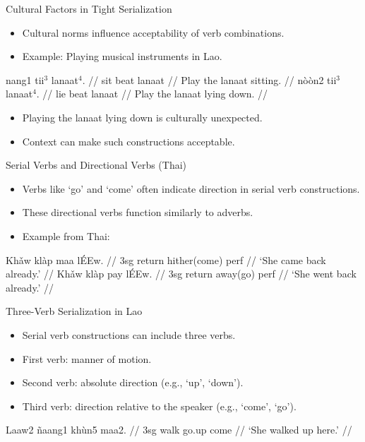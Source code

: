 \documentclass{beamer}
\begin{document}
\begin{frame}{Cultural Factors in Tight Serialization}
\begin{itemize}
    \item Cultural norms influence acceptability of verb combinations.
    \item Example: Playing musical instruments in Lao.
\end{itemize}
\ex
\begingl
\gla nang1 tii$^3$ lanaat$^4$. //
\glb sit beat lanaat //
\glft Play the lanaat sitting. //
\endgl
\xe
\ex
\begingl
\gla nòòn2 tii$^3$ lanaat$^4$. //
\glb lie beat lanaat //
\glft Play the lanaat lying down. //
\endgl
\xe
\begin{itemize}
    \item Playing the lanaat lying down is culturally unexpected.
    \item Context can make such constructions acceptable.
\end{itemize}
\end{frame}

\begin{frame}{Serial Verbs and Directional Verbs (Thai)}
\begin{itemize}
    \item Verbs like ‘go’ and ‘come’ often indicate direction in serial verb constructions.
    \item These directional verbs function similarly to adverbs.
    \item Example from Thai:
\end{itemize}
\ex
\begingl
\gla Khǎw klàp maa lÉEw. //
\glb 3sg return hither(come) perf //
\glft ‘She came back already.’ //
\endgl
\xe
\ex
\begingl
\gla Khǎw klàp pay lÉEw. //
\glb 3sg return away(go) perf //
\glft ‘She went back already.’ //
\endgl
\xe
\end{frame}

\begin{frame}{Three-Verb Serialization in Lao}
\begin{itemize}
    \item Serial verb constructions can include three verbs.
    \item First verb: manner of motion.
    \item Second verb: absolute direction (e.g., ‘up’, ‘down’).
    \item Third verb: direction relative to the speaker (e.g., ‘come’, ‘go’).
\end{itemize}
\ex
\begingl
\gla Laaw2 ñaang1 khùn5 maa2. //
\glb 3sg walk go.up come //
\glft ‘She walked up here.’ //
\endgl
\xe
\end{frame}
\end{document}
